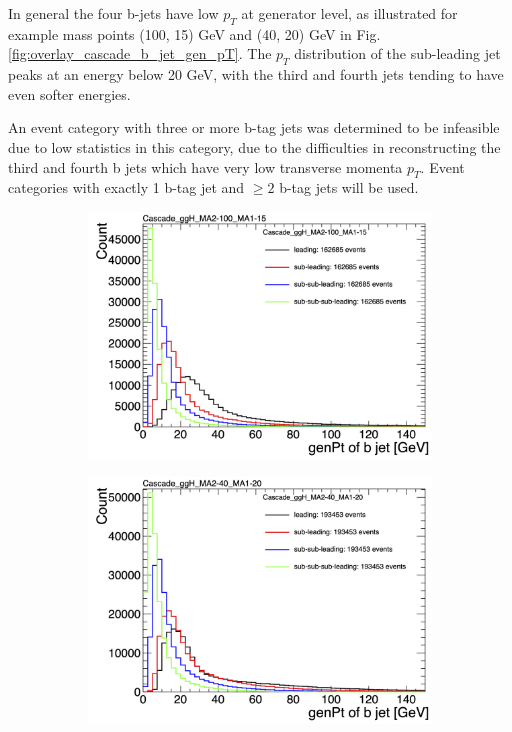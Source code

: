In general the four b-jets have low $p_{T}$ at generator level, as illustrated for example mass points (100, 15) GeV and (40, 20) GeV in Fig. \ref{fig:overlay_cascade_b_jet_gen_pT}. The $p_{T}$ distribution of the sub-leading jet peaks at an energy below 20 GeV, with the third and fourth jets tending to have even softer energies.

An event category with three or more b-tag jets was determined to be infeasible due to low statistics in this category, due to the difficulties in reconstructing the third and fourth b jets which have very low transverse momenta $p_{T}$. Event categories with exactly 1 b-tag jet and $\geq 2$ b-tag jets will be used.

\begin{figure}[h]
    \centering
    \begin{subfigure}{0.45\textwidth}
        \includegraphics[width=1.0\textwidth]{figures/ch-15-asymmetric/Cascade_ggH_MA2-100_MA1-15_overlay}
    \end{subfigure}
    \hfill
    \begin{subfigure}{0.45\textwidth}
        \includegraphics[width=1.0\textwidth]{figures/ch-15-asymmetric/Cascade_ggH_MA2-40_MA1-20_overlay}

\end{subfigure}
\end{figure}
